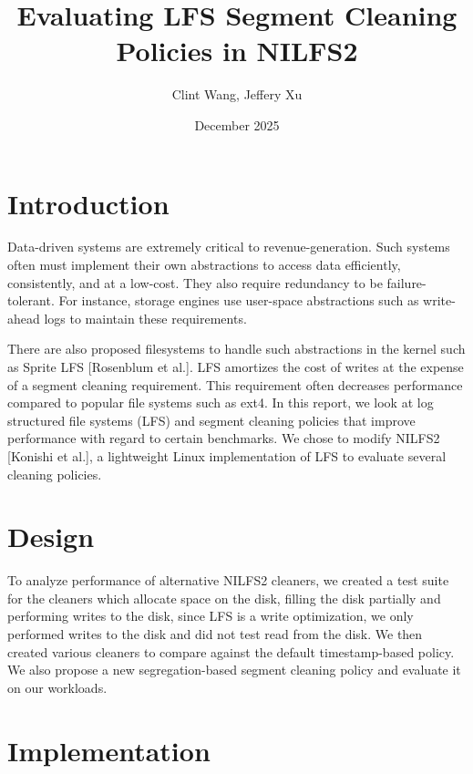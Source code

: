 \documentclass[12pt]{article}
\title{Evaluating LFS Segment Cleaning Policies in NILFS2}
\author{Clint Wang, Jeffery Xu}
\date{December 2025}
\begin{document}
\maketitle

\section{Introduction}
Data-driven systems are extremely critical to revenue-generation. Such systems often must implement their own abstractions to access data efficiently, consistently, and at a low-cost. They also require redundancy to be failure-tolerant. For instance, storage engines use user-space abstractions such as write-ahead logs to maintain these requirements. 

There are also proposed filesystems to handle such abstractions in the kernel such as Sprite LFS [Rosenblum et al.]. LFS amortizes the cost of writes at the expense of a segment cleaning requirement. This requirement often decreases performance compared to popular file systems such as ext4. In this report, we look at log structured file systems (LFS) and segment cleaning policies that improve performance with regard to certain benchmarks. We chose to modify NILFS2 [Konishi et al.], a lightweight Linux implementation of LFS to evaluate several cleaning policies. 

\section{Design}
To analyze performance of alternative NILFS2 cleaners, we created a test suite for the cleaners which allocate space on the disk, filling the disk partially and performing writes to the disk, since LFS is a write optimization, we only performed writes to the disk and did not test read from the disk. We then created various cleaners to compare against the default timestamp-based policy. We also propose a new segregation-based segment cleaning policy and evaluate it on our workloads. 

\section{Implementation}
\end{document}
